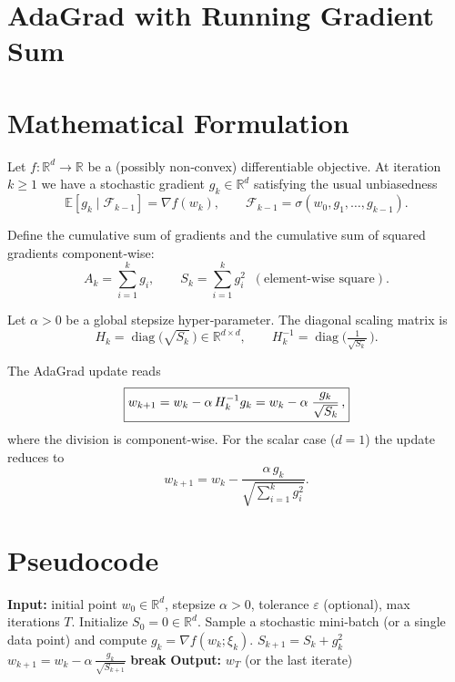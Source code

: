 \documentclass{article}
\begin{document}
\section*{AdaGrad with Running Gradient Sum}

\section*{Mathematical Formulation}
Let $f:\mathbb{R}^{d}\rightarrow\mathbb{R}$ be a (possibly non‑convex) differentiable objective.  
At iteration $k\ge 1$ we have a stochastic gradient $g_{k}\in\mathbb{R}^{d}$ satisfying the usual unbiasedness
\[
\mathbb{E}[g_{k}\mid\mathcal{F}_{k-1}]=\nabla f(w_{k}) ,
\qquad\mathcal{F}_{k-1}=\sigma(w_{0},g_{1},\dots ,g_{k-1}).
\]

Define the cumulative sum of gradients and the cumulative sum of squared gradients component‑wise:
\[
A_{k}= \sum_{i=1}^{k} g_{i},\qquad
S_{k}= \sum_{i=1}^{k} g_{i}^{2}\;\;(\text{element‑wise square}).
\]

Let $\alpha>0$ be a global stepsize hyper‑parameter.  
The diagonal scaling matrix is
\[
H_{k}= \operatorname{diag}\!\bigl(\sqrt{S_{k}}\,\bigr)\in\mathbb{R}^{d\times d},
\qquad
H_{k}^{-1}= \operatorname{diag}\!\bigl(\tfrac{1}{\sqrt{S_{k}}}\,\bigr).
\]

The AdaGrad update reads
\begin{equation}
\boxed{%
w_{k+1}= w_{k}-\alpha\,H_{k}^{-1}g_{k}
      = w_{k}-\alpha\;\frac{g_{k}}{\sqrt{S_{k}}}\,,
}
\label{eq:update}
\end{equation}
where the division is component‑wise.  
For the scalar case ($d=1$) the update reduces to
\[
w_{k+1}=w_{k}-\frac{\alpha\,g_{k}}{\sqrt{\sum_{i=1}^{k}g_{i}^{2}}}.
\]

\section*{Pseudocode}
\begin{algorithm}[H]
\caption{AdaGrad with Running Gradient Sum}
\begin{algorithmic}[1]
\State \textbf{Input:} initial point $w_{0}\in\mathbb{R}^{d}$, stepsize $\alpha>0$,
      tolerance $\varepsilon$ (optional), max iterations $T$.
\State Initialize $S_{0}=0\in\mathbb{R}^{d}$.
    \State Sample a stochastic mini‑batch (or a single data point) and compute 
          $g_{k}= \nabla f(w_{k};\xi_{k})$.
    \State $S_{k+1}= S_{k}+ g_{k}^{2}$ \hfill{}
    \State $w_{k+1}= w_{k}-\alpha\,\frac{g_{k}}{\sqrt{S_{k+1}}}$ \hfill{}
        \State \textbf{break}
    \EndIf
\EndFor
\State \textbf{Output:} $w_{T}$ (or the last iterate)
\end{algorithmic}
\end{algorithm}
\end{document}
